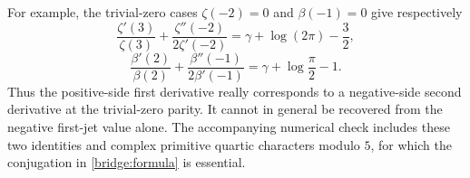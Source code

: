 For example, the trivial-zero cases $\zeta(-2)=0$ and $\beta(-1)=0$
give respectively
\[
 \frac{\zeta'(3)}{\zeta(3)}
 +\frac{\zeta''(-2)}{2\zeta'(-2)}
 =\gamma+\log(2\pi)-\frac32,
\]
\[
 \frac{\beta'(2)}{\beta(2)}
 +\frac{\beta''(-1)}{2\beta'(-1)}
 =\gamma+\log\frac\pi2-1.
\]
Thus the positive-side first derivative really corresponds to a
negative-side second derivative at the trivial-zero parity.  It cannot
in general be recovered from the negative first-jet value alone.
The accompanying numerical check includes these two identities and
complex primitive quartic characters modulo $5$, for which the
conjugation in \eqref{bridge:formula} is essential.
